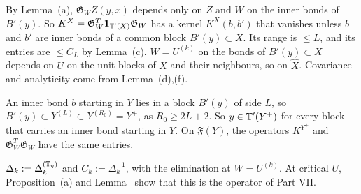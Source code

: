 \begin{detail}\label{d8:ix12}
\begin{step}[$K^X$]
By Lemma~(a), $\mathfrak G_WZ(y,x)$ depends only on $Z$ and $W$ on the inner bonds of $B'(y)$. So $K^X=\mathfrak G_W^T\mathbf 1_{\mathbb T'(X)}\mathfrak G_W$ has a kernel $K^X(b,b')$ that vanishes unless $b$ and $b'$ are inner bonds of a common block $B'(y)\subset X$. Its range is $\le L$, and its entries are $\le C_L$ by Lemma~(c). $W=U^{(k)}$ on the bonds of $B'(y)\subset X$ depends on $U$ on the unit blocks of $X$ and their neighbours, so on $\hat X$. Covariance and analyticity come from Lemma~(d),(f).
\end{step}
\begin{step}
An inner bond $b$ starting in $Y$ lies in a block $B'(y)$ of side $L$, so $B'(y)\subset Y^{(L)}\subset Y^{(R_0)}=Y^+$, as $R_0\ge2L+2$. So $y\in\mathbb T'(Y^+)$ for every block that carries an inner bond starting in $Y$. On $\mathfrak F(Y)$, the operators $K^{Y^+}$ and $\mathfrak G_W^T\mathfrak G_W$ have the same entries.
\end{step}
\begin{step}
$\Delta_k:=\Delta^{(\mathbb T_\eta)}_k$ and $C_k:=\Delta_k^{-1}$, with the elimination at $W=U^{(k)}$. At critical $U$, Proposition~(a) and Lemma~ show that this is the operator of Part VII.
\end{step}
\end{detail}

